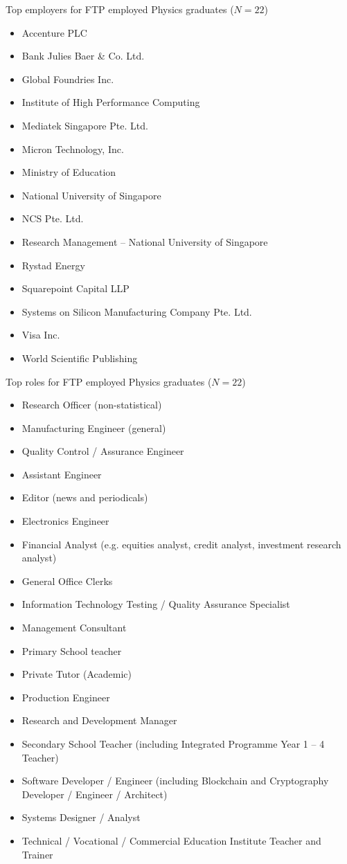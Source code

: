 \documentclass[12pt,a4paper]{article}
\begin{document}
Top employers for FTP employed Physics graduates ($N=22$)
\begin{itemize}
\item Accenture PLC
\item Bank Julies Baer \& Co. Ltd.
\item Global Foundries Inc.
\item Institute of High Performance Computing
\item Mediatek Singapore Pte. Ltd.
\item Micron Technology, Inc.
\item Ministry of Education
\item National University of Singapore
\item NCS Pte. Ltd.
\item Research Management -- National University of Singapore
\item Rystad Energy
\item Squarepoint Capital LLP
\item Systems on Silicon Manufacturing Company Pte. Ltd.
\item Visa Inc.
\item World Scientific Publishing
\end{itemize}

Top roles for FTP employed Physics graduates ($N=22$)
\begin{itemize}
\item Research Officer (non-statistical)
\item Manufacturing Engineer (general)
\item Quality Control / Assurance Engineer
\item Assistant Engineer
\item Editor (news and periodicals)
\item Electronics Engineer
\item Financial Analyst (e.g. equities analyst, credit analyst, investment research analyst)
\item General Office Clerks
\item Information Technology Testing / Quality Assurance Specialist
\item Management Consultant
\item Primary School teacher
\item Private Tutor (Academic)
\item Production Engineer
\item Research and Development Manager
\item Secondary School Teacher (including Integrated Programme Year 1 -- 4 Teacher)
\item Software Developer / Engineer (including Blockchain and Cryptography Developer / Engineer / Architect)
\item Systems Designer / Analyst
\item Technical / Vocational / Commercial Education Institute Teacher and Trainer
\end{itemize}
\end{document}

